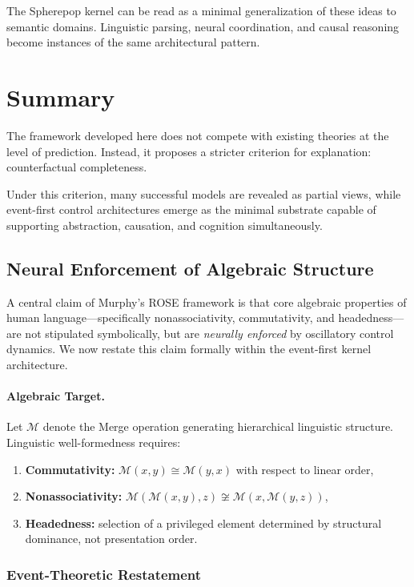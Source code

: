\documentclass[11pt]{article}
\begin{document}
The Spherepop kernel can be read as a minimal generalization of these ideas to semantic domains. Linguistic parsing, neural coordination, and causal reasoning become instances of the same architectural pattern.

\section{Summary}

The framework developed here does not compete with existing theories at the level of prediction. Instead, it proposes a stricter criterion for explanation: counterfactual completeness.

Under this criterion, many successful models are revealed as partial views, while event-first control architectures emerge as the minimal substrate capable of supporting abstraction, causation, and cognition simultaneously.

\subsection{Neural Enforcement of Algebraic Structure}
\label{subsec:algebraic_enforcement}

A central claim of Murphy’s ROSE framework is that core algebraic properties of human language—specifically nonassociativity, commutativity, and headedness—are not stipulated symbolically, but are \emph{neurally enforced} by oscillatory control dynamics. We now restate this claim formally within the event-first kernel architecture.

\paragraph{Algebraic Target.}
Let $\mathcal{M}$ denote the Merge operation generating hierarchical linguistic structure. Linguistic well-formedness requires:
\begin{enumerate}
  \item \textbf{Commutativity:} $\mathcal{M}(x,y) \cong \mathcal{M}(y,x)$ with respect to linear order,
  \item \textbf{Nonassociativity:} $\mathcal{M}(\mathcal{M}(x,y),z) \not\cong \mathcal{M}(x,\mathcal{M}(y,z))$,
  \item \textbf{Headedness:} selection of a privileged element determined by structural dominance, not presentation order.
\end{enumerate}

\subsubsection{Event-Theoretic Restatement}
\end{document}
